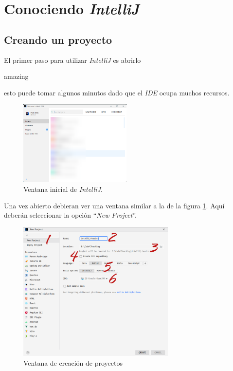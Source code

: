 
\section{Conociendo \textit{IntelliJ}} 
  \subsection{Creando un proyecto}
    El primer paso para utilizar \textit{IntelliJ} es abrirlo 
    \begin{center}
      amazing
    \end{center}
    esto puede tomar algunos minutos dado que el \textit{IDE} ocupa muchos recursos.

    \begin{figure}[ht!]
      \centering
      \includegraphics[width=0.5\textwidth]{img/Por_algo_se_empieza/idea64_HkClRzeuYD.png}
      \caption{Ventana inicial de \textit{IntelliJ}.}
      \label{fig:intellij-landing}
    \end{figure}
    
    Una vez abierto debieran ver una ventana similar a la de la figura \ref{fig:intellij-landing}.
    Aquí deberán seleccionar la opción \enquote{\textit{New Project}}.

    \begin{figure}[ht!]
      \centering
      \includegraphics[width=0.7\textwidth]{img/Por_algo_se_empieza/idea64_new_project_1.png}
      \caption{Ventana de creación de proyectos}
      \label{fig:intellij-new-project-1}
    \end{figure}

